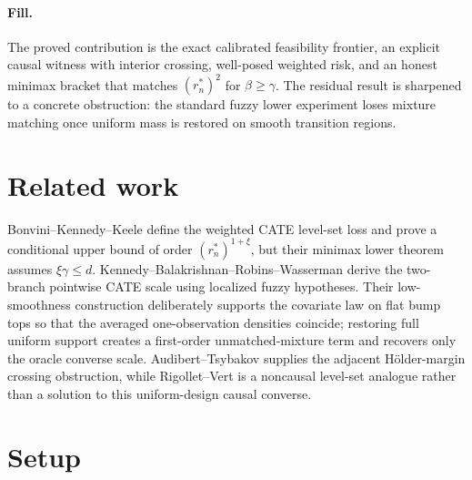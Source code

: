 \documentclass{article}
\begin{document}
\paragraph{Fill.} The proved contribution is the exact calibrated feasibility frontier, an explicit causal witness with interior crossing, well-posed weighted risk, and an honest minimax bracket that matches \((r_n^*)^2\) for \(\beta\ge\gamma\). The residual result is sharpened to a concrete obstruction: the standard fuzzy lower experiment loses mixture matching once uniform mass is restored on smooth transition regions.

\section{Related work}

Bonvini--Kennedy--Keele \cite{BonviniKennedyKeele2023MinimaxSubgroup} define the weighted CATE level-set loss and prove a conditional upper bound of order \((r_n^*)^{1+\xi}\), but their minimax lower theorem assumes \(\xi\gamma\le d\). Kennedy--Balakrishnan--Robins--Wasserman \cite{KennedyBalakrishnanRobinsWasserman2024MinimaxCATE} derive the two-branch pointwise CATE scale using localized fuzzy hypotheses. Their low-smoothness construction deliberately supports the covariate law on flat bump tops so that the averaged one-observation densities coincide; restoring full uniform support creates a first-order unmatched-mixture term and recovers only the oracle converse scale. Audibert--Tsybakov \cite{AudibertTsybakov2007FastPlugin} supplies the adjacent Hölder-margin crossing obstruction, while Rigollet--Vert \cite{RigolletVert2009DensityLevelSets} is a noncausal level-set analogue rather than a solution to this uniform-design causal converse.

\section{Setup}
\end{document}
